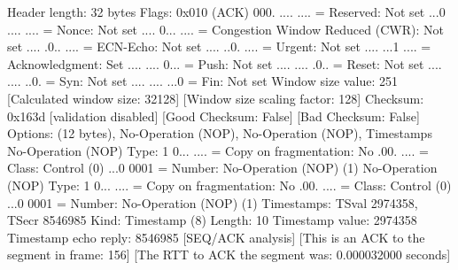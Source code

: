    Header length: 32 bytes
    Flags: 0x010 (ACK)
        000. .... .... = Reserved: Not set
        ...0 .... .... = Nonce: Not set
        .... 0... .... = Congestion Window Reduced (CWR): Not set
        .... .0.. .... = ECN-Echo: Not set
        .... ..0. .... = Urgent: Not set
        .... ...1 .... = Acknowledgment: Set
        .... .... 0... = Push: Not set
        .... .... .0.. = Reset: Not set
        .... .... ..0. = Syn: Not set
        .... .... ...0 = Fin: Not set
    Window size value: 251
    [Calculated window size: 32128]
    [Window size scaling factor: 128]
    Checksum: 0x163d [validation disabled]
        [Good Checksum: False]
        [Bad Checksum: False]
    Options: (12 bytes), No-Operation (NOP), No-Operation (NOP), Timestamps
        No-Operation (NOP)
            Type: 1
                0... .... = Copy on fragmentation: No
                .00. .... = Class: Control (0)
                ...0 0001 = Number: No-Operation (NOP) (1)
        No-Operation (NOP)
            Type: 1
                0... .... = Copy on fragmentation: No
                .00. .... = Class: Control (0)
                ...0 0001 = Number: No-Operation (NOP) (1)
        Timestamps: TSval 2974358, TSecr 8546985
            Kind: Timestamp (8)
            Length: 10
            Timestamp value: 2974358
            Timestamp echo reply: 8546985
    [SEQ/ACK analysis]
        [This is an ACK to the segment in frame: 156]
        [The RTT to ACK the segment was: 0.000032000 seconds]
